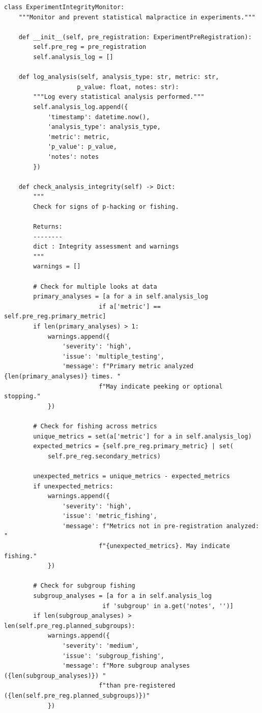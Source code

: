\lstset{language=Python, caption=P-Hacking Detection and Prevention}
\begin{lstlisting}
class ExperimentIntegrityMonitor:
    """Monitor and prevent statistical malpractice in experiments."""

    def __init__(self, pre_registration: ExperimentPreRegistration):
        self.pre_reg = pre_registration
        self.analysis_log = []

    def log_analysis(self, analysis_type: str, metric: str,
                    p_value: float, notes: str):
        """Log every statistical analysis performed."""
        self.analysis_log.append({
            'timestamp': datetime.now(),
            'analysis_type': analysis_type,
            'metric': metric,
            'p_value': p_value,
            'notes': notes
        })

    def check_analysis_integrity(self) -> Dict:
        """
        Check for signs of p-hacking or fishing.

        Returns:
        --------
        dict : Integrity assessment and warnings
        """
        warnings = []

        # Check for multiple looks at data
        primary_analyses = [a for a in self.analysis_log
                          if a['metric'] == self.pre_reg.primary_metric]
        if len(primary_analyses) > 1:
            warnings.append({
                'severity': 'high',
                'issue': 'multiple_testing',
                'message': f"Primary metric analyzed {len(primary_analyses)} times. "
                          f"May indicate peeking or optional stopping."
            })

        # Check for fishing across metrics
        unique_metrics = set(a['metric'] for a in self.analysis_log)
        expected_metrics = {self.pre_reg.primary_metric} | set(
            self.pre_reg.secondary_metrics)

        unexpected_metrics = unique_metrics - expected_metrics
        if unexpected_metrics:
            warnings.append({
                'severity': 'high',
                'issue': 'metric_fishing',
                'message': f"Metrics not in pre-registration analyzed: "
                          f"{unexpected_metrics}. May indicate fishing."
            })

        # Check for subgroup fishing
        subgroup_analyses = [a for a in self.analysis_log
                           if 'subgroup' in a.get('notes', '')]
        if len(subgroup_analyses) > len(self.pre_reg.planned_subgroups):
            warnings.append({
                'severity': 'medium',
                'issue': 'subgroup_fishing',
                'message': f"More subgroup analyses ({len(subgroup_analyses)}) "
                          f"than pre-registered ({len(self.pre_reg.planned_subgroups)})"
            })


\end{lstlisting}
